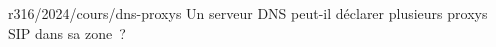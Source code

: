 \begin{question}{r316/2024/cours/dns-proxys}
  Un serveur DNS peut-il déclarer plusieurs proxys SIP dans sa zone~?
  \begin{reponses}
  \end{reponses}
\end{question}
